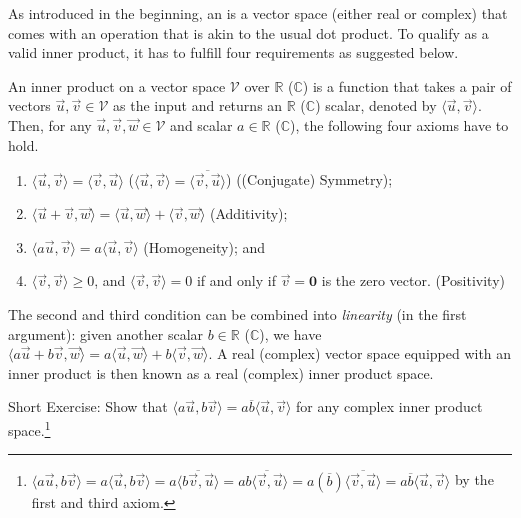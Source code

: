 As introduced in the beginning, an  is a vector space (either real or complex) that comes with an  operation that is akin to the usual dot product. To qualify as a valid inner product, it has to fulfill four requirements as suggested below.
\begin{defn}
\label{defn:innerprod}
An inner product on a vector space $\mathcal{V}$ over $\mathbb{R}$ ($\mathbb{C}$) is a function that takes a pair of vectors $\vec{u}, \vec{v} \in \mathcal{V}$ as the input and returns an $\mathbb{R}$ ($\mathbb{C}$) scalar, denoted by $\langle \vec{u}, \vec{v} \rangle$. Then, for any $\vec{u}, \vec{v}, \vec{w} \in \mathcal{V}$ and scalar $a \in \mathbb{R}$ ($\mathbb{C}$), the following four axioms have to hold.
\begin{enumerate}
    \item $\langle \vec{u}, \vec{v} \rangle = \langle \vec{v}, \vec{u} \rangle$ ($\langle \vec{u}, \vec{v} \rangle = \overline{\langle \vec{v}, \vec{u} \rangle}$) ((Conjugate) Symmetry);
    \item $\langle \vec{u}+\vec{v}, \vec{w} \rangle = \langle \vec{u}, \vec{w} \rangle + \langle \vec{v}, \vec{w} \rangle$ (Additivity);
    \item $\langle a\vec{u}, \vec{v} \rangle = a\langle \vec{u}, \vec{v} \rangle$ (Homogeneity); and
    \item $\langle \vec{v}, \vec{v} \rangle \geq 0$, and $\langle \vec{v}, \vec{v} \rangle = 0$ if and only if $\vec{v} = \textbf{0}$ is the zero vector. (Positivity)
\end{enumerate}
The second and third condition can be combined into \textit{linearity} (in the first argument): given another scalar $b \in \mathbb{R}$ ($\mathbb{C}$), we have $\langle a\vec{u}+b\vec{v}, \vec{w} \rangle = a\langle \vec{u}, \vec{w} \rangle + b\langle \vec{v}, \vec{w} \rangle$. A real (complex) vector space equipped with an inner product is then known as a real (complex) inner product space. 
\end{defn}
Short Exercise: Show that $\langle a\vec{u}, b\vec{v} \rangle = a\overline{b}\langle \vec{u}, \vec{v} \rangle$ for any complex inner product space.\footnote{$\langle a\vec{u}, b\vec{v} \rangle = a\langle \vec{u}, b\vec{v} \rangle = a\overline{\langle b\vec{v}, \vec{u} \rangle} = a\overline{b\langle \vec{v}, \vec{u} \rangle} = a(\overline{b}) \overline{\langle \vec{v}, \vec{u} \rangle} = a\overline{b}\langle \vec{u}, \vec{v} \rangle$ by the first and third axiom.}\par
